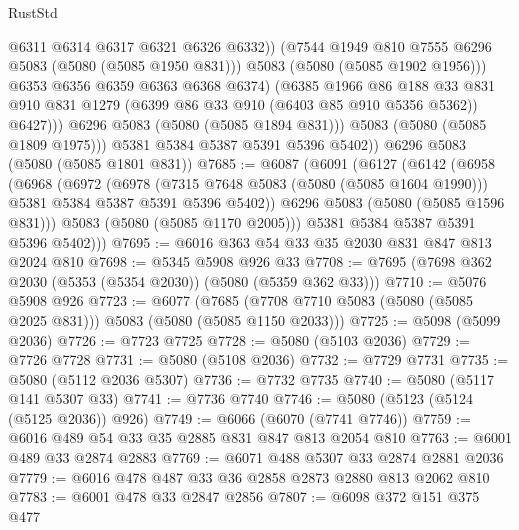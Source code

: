 \begin{lexlean}{RustStd}
\begin{coremodule}
{\begin{coremodule}
{{{{{                        @6311
                        @6314
                        @6317
                        @6321
                        @6326
                        @6332))
                    (@7544 @1949 @810 @7555 @6296 @5083 (@5080 (@5085 @1950 @831)))
                    @5083
                    (@5080 (@5085 @1902 @1956)))
                  @6353
                  @6356
                  @6359
                  @6363
                  @6368
                  @6374)
                (@6385
                  @1966
                  @86
                  @188
                  @33
                  @831
                  @910
                  @831
                  @1279
                  (@6399 @86 @33 @910 (@6403 @85 @910 @5356 @5362))
                  @6427)))
            @6296
            @5083
            (@5080 (@5085 @1894 @831)))
          @5083
          (@5080 (@5085 @1809 @1975)))
        @5381
        @5384
        @5387
        @5391
        @5396
        @5402))
    @6296
    @5083
    (@5080 (@5085 @1801 @831))
@7685 := @6087
    (@6091
      (@6127
        (@6142
          (@6958
            (@6968
              (@6972
                (@6978
                  (@7315 @7648 @5083 (@5080 (@5085 @1604 @1990)))
                  @5381
                  @5384
                  @5387
                  @5391
                  @5396
                  @5402))
              @6296
              @5083
              (@5080 (@5085 @1596 @831)))
            @5083
            (@5080 (@5085 @1170 @2005)))
          @5381
          @5384
          @5387
          @5391
          @5396
          @5402)))
@7695 := @6016 @363 @54 @33 @35 @2030 @831 @847 @813 @2024 @810
@7698 := @5345 @5908 @926 @33
@7708 := @7695 (@7698 @362 @2030 (@5353 (@5354 @2030)) (@5080 (@5359 @362 @33)))
@7710 := @5076 @5908 @926
@7723 := @6077
    (@7685 (@7708 @7710 @5083 (@5080 (@5085 @2025 @831))) @5083 (@5080 (@5085 @1150 @2033)))
@7725 := @5098 (@5099 @2036)
@7726 := @7723 @7725
@7728 := @5080 (@5103 @2036)
@7729 := @7726 @7728
@7731 := @5080 (@5108 @2036)
@7732 := @7729 @7731
@7735 := @5080 (@5112 @2036 @5307)
@7736 := @7732 @7735
@7740 := @5080 (@5117 @141 @5307 @33)
@7741 := @7736 @7740
@7746 := @5080 (@5123 (@5124 (@5125 @2036)) @926)
@7749 := @6066 (@6070 (@7741 @7746))
@7759 := @6016 @489 @54 @33 @35 @2885 @831 @847 @813 @2054 @810
@7763 := @6001 @489 @33 @2874 @2883
@7769 := @6071 @488 @5307 @33 @2874 @2881 @2036
@7779 := @6016 @478 @487 @33 @36 @2858 @2873 @2880 @813 @2062 @810
@7783 := @6001 @478 @33 @2847 @2856
@7807 := @6098
    @372
    @151
    @375
    @477
}}}}}
\end{coremodule}}
\end{coremodule}
\end{lexlean}
